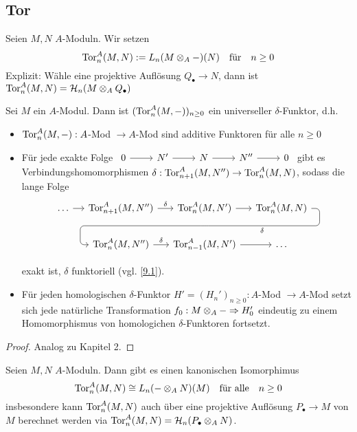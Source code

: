 \subsection{Tor}
\begin{df}\label{14.1}
	Seien $M,N$ $A$-Moduln. Wir setzen $$\text{Tor}_n^A(M,N)\index{Tor} := L_n(M \otimes_A -)(N) \quad \text{für} \quad n\geq 0$$
	Explizit: Wähle eine projektive Auflösung $Q_ \bullet \to N$, dann ist $\text{Tor}_n^A(M,N) = \mathcal{H}_n(M \otimes_A Q_\bullet)$
\end{df}
\begin{sa}\label{14.2}
	Sei $M$ ein $A$-Modul. Dann ist $(\text{Tor}_n^A(M,-))_{n\geq 0}$ ein universeller $\delta$-Funktor, d.h.
	\begin{itemize}
		\item $\text{Tor}_n^A(M,-): A$-Mod $\to A$-Mod sind additive Funktoren für alle $n\geq 0$
		\item Für jede exakte Folge $\begin{tikzcd}
		0 \arrow{r} & N' \arrow{r} & N \arrow{r} & N'' \arrow{r} & 0
		\end{tikzcd}$ gibt es Verbindungshomomorphismen $\delta:\text{Tor}_{n+1}^A(M,N'') \to \text{Tor}_n^A(M,N)$, sodass die lange Folge 
		$$\begin{tikzcd}[column sep = small]
		 \ldots \arrow{r} & \Tor_{n+1}^A(M,N'') \arrow{r}{\delta} & \Tor_n^A(M,N')\arrow[d, phantom, ""{coordinate, name=Z}] \arrow{r} & \Tor_n^A(M,N) \arrow[dll,
		 "\delta",
		 rounded corners,
		 to path=
		 { -- ([xshift=2ex]\tikztostart.east)
		 	|- (Z) [near end]\tikztonodes
		 	-| ([xshift=-2ex]\tikztotarget.west)
		 	-- (\tikztotarget)}
		 ]\\
	 & \Tor_n^A(M,N'') \arrow{r}{\delta} & \Tor_{n-1}^A(M,N') \arrow{r} & \ldots 
		\end{tikzcd}$$

		exakt ist, $\delta$ funktoriell (vgl. \ref{9.1}).
		\item Für jeden homologischen $\delta$-Funktor $H'=(H_n')_{n\geq 0}: A$-Mod $ \to A$-Mod setzt sich jede natürliche Transformation $f_0 : M \otimes_A - \Rightarrow H_0'$ eindeutig zu einem Homomorphismus von homologichen $\delta$-Funktoren fortsetzt.
	\end{itemize}
\end{sa}
\begin{proof}
	Analog zu Kapitel 2.
\end{proof}
\begin{sa}\label{14.3}
	Seien $M,N$ $A$-Moduln. Dann gibt es einen kanonischen Isomorphimus 
	$$\text{Tor}_n^A(M,N) \cong L_n(- \otimes_A N)(M) \quad \text{für alle} \quad n\geq 0$$
	insbesondere kann $\text{Tor}_n^A(M,N)$ auch über eine projektive Auflösung $P_\bullet\to M$ von $M$ berechnet werden via $\text{Tor}_n^A(M,N) = \mathcal{H}_n (P_\bullet \otimes_A N)$.
\end{sa}
